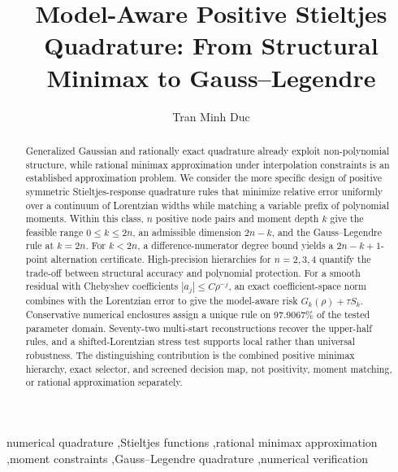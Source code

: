 \documentclass[preprint,12pt]{elsarticle}
\theoremstyle{remark}
\begin{document}
\begin{frontmatter}

\title{Model-Aware Positive Stieltjes Quadrature:
From Structural Minimax to Gauss--Legendre}

\author[inst1]{Tran Minh Duc}


\begin{abstract}
Generalized Gaussian and rationally exact quadrature already exploit
non-polynomial structure, while rational minimax approximation under
interpolation constraints is an established approximation problem. We
consider the more specific design of positive symmetric
Stieltjes-response quadrature rules that minimize relative error
uniformly over a continuum of Lorentzian widths while matching a
variable prefix of polynomial moments. Within this class, \(n\) positive
node pairs and moment depth \(k\) give the feasible range
\(0\leq k\leq2n\), an admissible dimension \(2n-k\), and the
Gauss--Legendre rule at \(k=2n\). For \(k<2n\), a difference-numerator
degree bound yields a \(2n-k+1\)-point alternation certificate.
High-precision hierarchies for \(n=2,3,4\) quantify the trade-off
between structural accuracy and polynomial protection. For a smooth
residual with Chebyshev coefficients \(|a_j|\leq C\rho^{-j}\), an exact
coefficient-space norm combines with the Lorentzian error to give the
model-aware risk \(G_k(\rho)+\tau S_k\). Conservative numerical
enclosures assign a unique rule on 97.9067\% of the tested parameter
domain. Seventy-two multi-start reconstructions recover the upper-half
rules, and a shifted-Lorentzian stress test supports local rather than
universal robustness. The distinguishing contribution is the combined
positive minimax hierarchy, exact selector, and screened decision map, not
positivity, moment matching, or rational approximation separately.
\end{abstract}

\begin{keyword}
numerical quadrature \sep Stieltjes functions \sep rational minimax
approximation \sep moment constraints \sep Gauss--Legendre quadrature
\sep numerical verification
\end{keyword}

\end{frontmatter}
\end{document}
